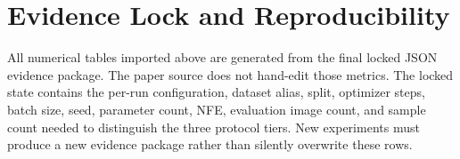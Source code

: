 \section{Evidence Lock and Reproducibility}

All numerical tables imported above are generated from the final locked JSON
evidence package. The paper source does not hand-edit those metrics. The locked
state contains the per-run configuration, dataset alias, split, optimizer
steps, batch size, seed, parameter count, NFE, evaluation image count, and
sample count needed to distinguish the three protocol tiers. New experiments
must produce a new evidence package rather than silently overwrite these rows.
